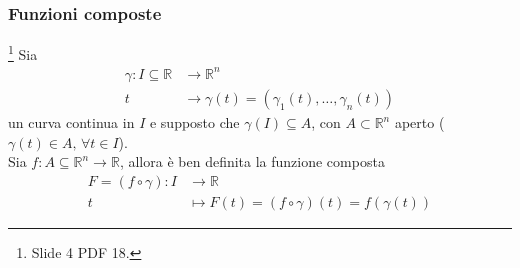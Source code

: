 \subsubsection{Funzioni composte}
\begin{definition}\footnote{Slide 4 PDF 18.}
	Sia
	\begin{equation*}
		\begin{aligned}
			\gamma:I\subseteq\mathbb{R}&\rightarrow\mathbb{R}^n\\
			t&\rightarrow \gamma(t)=(\gamma_1(t),\hdots,\gamma_n(t))
		\end{aligned}
	\end{equation*}
	un curva continua in $I$ e supposto che $\gamma(I)\subseteq A$, con $A\subset\mathbb{R}^n$ aperto ($\gamma(t)\in A,\, \forall t\in I$).\\
	Sia $f:A\subseteq\mathbb{R}^n\rightarrow \mathbb{R}$, allora è ben definita la funzione composta
	\begin{equation*}
		\begin{aligned}
			F=(f\circ \gamma):I &\rightarrow\mathbb{R}\\
			t & \mapsto F(t) = (f\circ \gamma)(t) = f(\gamma(t))
		\end{aligned}
	\end{equation*}
\end{definition}

